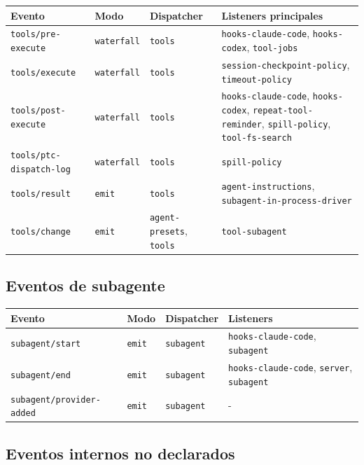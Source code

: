 \documentclass[11pt,a4paper]{article}
\begin{document}
\begin{center}
\begin{tabular}{@{}llll@{}}
\toprule
Evento & Modo & Dispatcher & Listeners principales \\
\midrule
\texttt{tools/pre-execute} & \texttt{waterfall} & \texttt{tools} & \texttt{hooks-claude-code}, \texttt{hooks-codex}, \texttt{tool-jobs} \\
\texttt{tools/execute} & \texttt{waterfall} & \texttt{tools} & \texttt{session-checkpoint-policy}, \texttt{timeout-policy} \\
\texttt{tools/post-execute} & \texttt{waterfall} & \texttt{tools} & \texttt{hooks-claude-code}, \texttt{hooks-codex}, \texttt{repeat-tool-reminder}, \texttt{spill-policy}, \texttt{tool-fs-search} \\
\texttt{tools/ptc-dispatch-log} & \texttt{waterfall} & \texttt{tools} & \texttt{spill-policy} \\
\texttt{tools/result} & \texttt{emit} & \texttt{tools} & \texttt{agent-instructions}, \texttt{subagent-in-process-driver} \\
\texttt{tools/change} & \texttt{emit} & \texttt{agent-presets}, \texttt{tools} & \texttt{tool-subagent} \\
\bottomrule
\end{tabular}
\end{center}



\subsection*{Eventos de subagente}


\begin{center}
\begin{tabular}{@{}llll@{}}
\toprule
Evento & Modo & Dispatcher & Listeners \\
\midrule
\texttt{subagent/start} & \texttt{emit} & \texttt{subagent} & \texttt{hooks-claude-code}, \texttt{subagent} \\
\texttt{subagent/end} & \texttt{emit} & \texttt{subagent} & \texttt{hooks-claude-code}, \texttt{server}, \texttt{subagent} \\
\texttt{subagent/provider-added} & \texttt{emit} & \texttt{subagent} & - \\
\bottomrule
\end{tabular}
\end{center}



\subsection*{Eventos internos no declarados}
\end{document}
